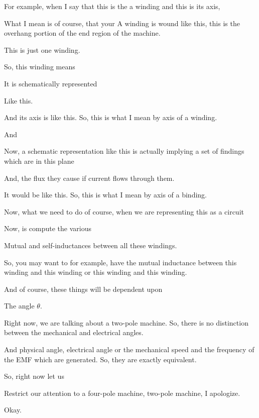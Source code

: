 \documentclass{article}
\begin{document}
For example, when I say that this is the a winding and this is its axis,

What I mean is of course, that your A winding is wound like this, this is the overhang portion of the end region of the machine.

This is just one winding.

So, this winding means

It is schematically represented

Like this.

And its axis is like this. So, this is what I mean by axis of a winding.

And

Now, a schematic representation like this is actually implying a set of findings which are in this plane

And, the flux they cause if current flows through them.

It would be like this. So, this is what I mean by axis of a binding.

Now, what we need to do of course, when we are representing this as a circuit

Now, is compute the various

Mutual and self-inductances between all these windings.

So, you may want to for example, have the mutual inductance between this winding and this winding or this winding and this winding.

And of course, these things will be dependent upon

The angle $\theta$.

Right now, we are talking about a two-pole machine. So, there is no distinction between the mechanical and electrical angles.

And physical angle, electrical angle or the mechanical speed and the frequency of the EMF which are generated. So, they are exactly equivalent.

So, right now let us

Restrict our attention to a four-pole machine, two-pole machine, I apologize.

Okay.
\end{document}
